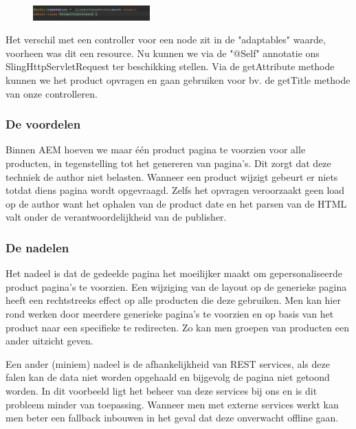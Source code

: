 \documentclass{article}
\begin{document}
    \begin{figure}
  		\includegraphics[width=0.4\textwidth]{images/request-controller.PNG}
  		\label{fig:request-controller}
	\end{figure}
    
    Het verschil met een controller voor een node zit in de "adaptables" waarde, voorheen was dit een resource. Nu kunnen we via de "@Self" annotatie ons SlingHttpServletRequest ter beschikking stellen. Via de getAttribute methode kunnen we het product opvragen en gaan gebruiken voor bv. de getTitle methode van onze controlleren. 
	\subsubsection{De voordelen}
    Binnen AEM hoeven we maar \'e\'en product pagina te voorzien voor alle producten, in tegenstelling tot het genereren van pagina's. Dit zorgt dat deze techniek de author niet belasten. Wanneer een product wijzigt gebeurt er niets totdat diens pagina wordt opgevraagd. Zelfs het opvragen veroorzaakt geen load op de author want het ophalen van de product date en het parsen van de HTML valt onder de verantwoordelijkheid van de publisher.
	\subsubsection{De nadelen}
    Het nadeel is dat de gedeelde pagina het moeilijker maakt om gepersonaliseerde product pagina's te voorzien. Een wijziging van de layout op de generieke pagina heeft een rechtstreeks effect op alle producten die deze gebruiken. Men kan hier rond werken door meerdere generieke pagina's te voorzien en op basis van het product naar een specifieke te redirecten. Zo kan men groepen van producten een ander uitzicht geven.
    \par
    Een ander (miniem) nadeel is de afhankelijkheid van REST services, als deze falen kan de data niet worden opgehaald en bijgevolg de pagina niet getoond worden. In dit voorbeeld ligt het beheer van deze services bij ons en is dit probleem minder van toepassing. Wanneer men met externe services werkt kan men beter een fallback inbouwen in het geval dat deze onverwacht offline gaan.
\end{document}
